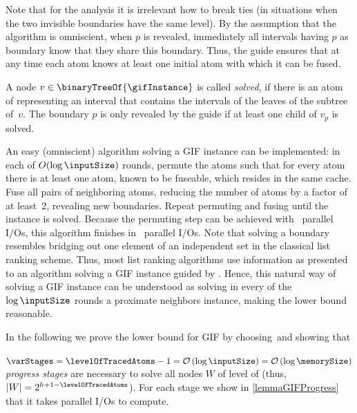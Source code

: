 \documentclass[envcountsame]{llncs}
\def\bO#1{\printmath{\mathcal{O}\left(#1\right)}}
\def\bOm#1{\printmath{\Omega \left(#1\right)}}
\begin{document}
Note that for the analysis it is irrelevant how to break ties (in situations when the two invisible boundaries have the same level).
By the assumption that the algorithm is omniscient, when $p$ is revealed, immediately all intervals having $p$ as boundary know that they share this boundary.
Thus, the guide ensures that at any time each atom knows at least one initial atom with which it can be fused.

A node $v\in\binaryTreeOf{\gifInstance}$ is called \emph{solved}, if there is an atom of \gifInstance representing an interval that contains the intervals of the leaves of the subtree of~$v$.
The boundary $p$ is only revealed by the guide if at least one child of $v_p$ is solved. 

An easy (omniscient) algorithm solving a GIF instance can be implemented: in each of $O(\log \inputSize)$ rounds, permute the atoms such that for every atom there is at least one atom, known to be fuseable, which resides in the same cache. Fuse all pairs of neighboring atoms, reducing the number of atoms by a factor of at least~2, revealing new boundaries.
Repeat permuting and fusing until the instance is solved.
Because the permuting step can be achieved with~\bO{\log \inputSize} parallel I/Os, this algorithm finishes in~\bO{\log^2 \inputSize} parallel I/Os.
Note that solving a boundary resembles bridging out one element of an independent set in the classical list ranking scheme.  
Thus, most list ranking algorithms use information as presented to an algorithm solving a GIF instance \gifInstance guided by \binaryTreeOf{\gifInstance}.
Hence, this natural way of solving a GIF instance can be understood as solving in every of the $\log\inputSize$ rounds a proximate neighbors instance, making the \bOm{\log^2\inputSize} lower bound reasonable.



In the following we prove the lower bound for GIF by choosing~\levelOfTracedAtoms and showing that ~$\varStages=\levelOfTracedAtoms-1=\bO{\log \inputSize}=\bO{\log\memorySize}$ \emph{progress stages} are necessary to solve all nodes $W$ of level \levelOfTracedAtoms of \binaryTreeOf{\gifInstance} (thus, $|W|=2^{h+1-\levelOfTracedAtoms}$). 
For each stage we show in \autoref{lemmaGIFProgress} that it takes \bOm{\log\inputSize} parallel I/Os to compute.

\end{document}
